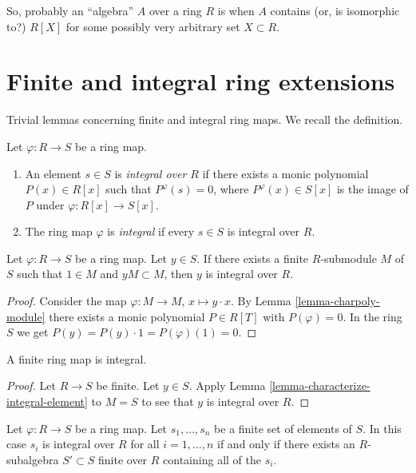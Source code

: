 So, probably an ``algebra'' $A$ over a ring  $R$ is when $A$ contains 
(or, is isomorphic to?)  $R[X]$ for some possibly very arbitrary set
 $X\subset R$.


\section{Finite and integral ring extensions}
\label{section-finite-ring-extensions}

Trivial lemmas concerning finite and integral ring maps.
We recall the definition.

\begin{definition}
\label{definition-integral-ring-map}
Let $\varphi : R \to S$ be a ring map.
\begin{enumerate}
\item An element $s \in S$
is {\it integral over $R$} if there exists a monic
polynomial $P(x) \in R[x]$ such that
$P^\varphi(s) = 0$, where $P^\varphi(x) \in S[x]$
is the image of $P$ under $\varphi : R[x] \to S[x]$.
\item  The ring map $\varphi$ is {\it integral}
if every $s \in S$ is integral over $R$.
\end{enumerate}
\end{definition}

\begin{lemma}
\label{lemma-characterize-integral-element}
Let $\varphi : R \to S$ be a ring map. Let $y \in S$. If there exists a
finite $R$-submodule $M$ of $S$ such that $1 \in M$ and $yM \subset M$,
then $y$ is integral over $R$.
\end{lemma}

\begin{proof}
Consider the map $\varphi : M \to M$, $x \mapsto y \cdot x$.
By Lemma \ref{lemma-charpoly-module} there exists a monic polynomial
$P \in R[T]$ with $P(\varphi) = 0$. In the ring $S$ we get
$P(y) = P(y) \cdot 1 = P(\varphi)(1) = 0$.
\end{proof}

\begin{lemma}
\label{lemma-finite-is-integral}
A finite ring map is integral.
\end{lemma}

\begin{proof}
Let $R \to S$ be finite. Let $y \in S$. Apply
Lemma \ref{lemma-characterize-integral-element}
to $M = S$ to see that $y$ is integral over $R$.
\end{proof}

\begin{lemma}
\label{lemma-characterize-integral}
Let $\varphi : R \to S$ be a ring map. Let $s_1, \ldots, s_n$
be a finite set of elements of $S$.
In this case $s_i$ is integral over $R$ for all $i = 1, \ldots, n$
if and only if
there exists an $R$-subalgebra $S' \subset S$ finite over $R$
containing all of the $s_i$.
\end{lemma}

